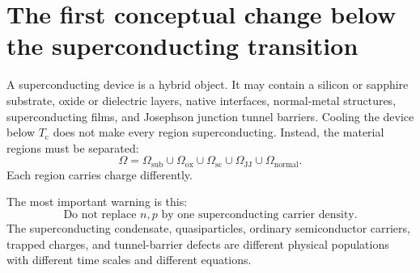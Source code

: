 \documentclass[11pt]{article}
\newcommand{\Om}{\Omega}
\newcommand{\Osub}{\Omega_{\mathrm{sub}}}
\newcommand{\Oox}{\Omega_{\mathrm{ox}}}
\newcommand{\Osc}{\Omega_{\mathrm{sc}}}
\newcommand{\Ojj}{\Omega_{\mathrm{JJ}}}
\newcommand{\Tc}{T_{\mathrm{c}}}
\begin{document}
\section{The first conceptual change below the superconducting transition}

A superconducting device is a hybrid object. It may contain a silicon or sapphire substrate, oxide or dielectric layers, native interfaces, normal-metal structures, superconducting films, and Josephson junction tunnel barriers. Cooling the device below \(\Tc\) does not make every region superconducting. Instead, the material regions must be separated:
\begin{equation}
\Om = \Osub \cup \Oox \cup \Osc \cup \Ojj \cup \Omega_{\mathrm{normal}}.
\end{equation}
Each region carries charge differently.

\begin{center}
\end{center}

The most important warning is this:
\begin{equation}
\boxed{\text{Do not replace } n,p \text{ by one superconducting carrier density.}}
\end{equation}
The superconducting condensate, quasiparticles, ordinary semiconductor carriers, trapped charges, and tunnel-barrier defects are different physical populations with different time scales and different equations.
\end{document}
